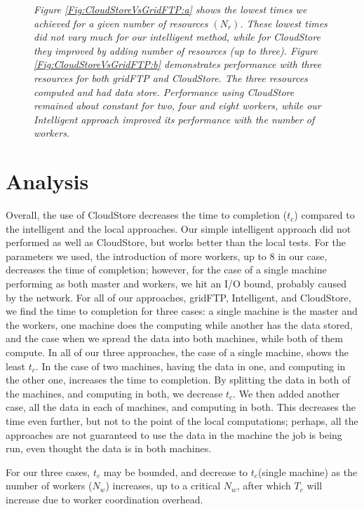 \documentclass{rspublic}
\begin{document}
\begin{figure}
\begin{center}
{\label{Fig:CloudStoreVsGridFTP:b}
}
\caption{\textit{Figure \ref{Fig:CloudStoreVsGridFTP:a}
 shows the lowest times we achieved for a given number of resources
 $(N_{r})$. These lowest times did not vary much for our intelligent
 method, while for CloudStore they improved by adding number of
 resources (up to three). Figure \ref{Fig:CloudStoreVsGridFTP:b}
 demonstrates performance with three resources for both gridFTP and
 CloudStore. The three resources computed and had data store.
 Performance using CloudStore remained about constant for two, four and
 eight workers, while our Intelligent approach improved its performance
 with the number of workers.}}
\label{Fig:CloudStoreVsGridFTP}
\end{center}
\end{figure}

%

\section{Analysis}

Overall, the use of CloudStore decreases the time to completion
($t_c$) compared to the intelligent and the local approaches. Our
simple intelligent approach did not performed as well as CloudStore, but
works better than the local tests. For the parameters we used, the
introduction of more workers, up to 8 in our case, decreases the time of
completion; however, for the case of a single machine performing as both
master and workers, we hit an I/O bound, probably caused by the network.
For all of our approaches, gridFTP, Intelligent, and CloudStore, we find
the time to completion for three cases: a single machine is the master
and the workers, one machine does the computing while another has the
data stored, and the case when we spread the data into both machines,
while both of them compute.  In all of our three approaches, the case of
a single machine, shows the least $t_c$. In the case of two machines,
having the data in one, and computing in the other one, increases the
time to completion. By splitting the data in both of the machines, and
computing in both, we decrease $t_c$. We then added another case, all
the data in each of machines, and computing in both. This decreases the
time even further, but not to the point of the local computations;
perhaps, all the approaches are not guaranteed to use the data in the
machine the job is being run, even thought the data is in both machines.

For our three cases,  $t_c$ may be bounded, and decrease to $t_c$(single
machine) as  the number of workers ($N_w$) increases, up to a critical
$N_w$, after which $T_c$ will increase due to worker coordination
overhead.
\end{document}

